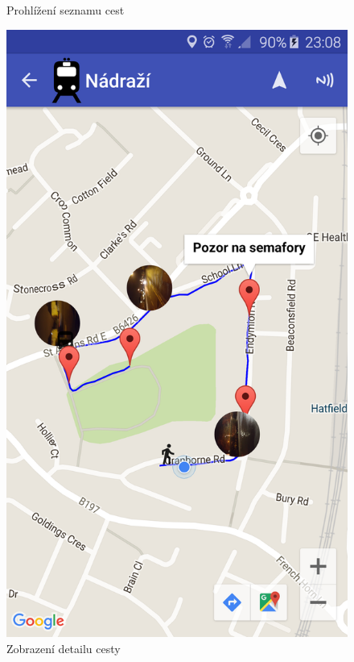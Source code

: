 \documentclass{article}
\begin{document}
\begin{figure}[H]
\begin{minipage}{.5\textwidth}
        \caption{Prohlížení seznamu cest}
        \label{fig:prohlizeniasistent}
\end{minipage}
\begin{minipage}{.5\textwidth}
    \centering
                    \includegraphics[scale=0.14]{img/screen/detailcesty.png}
            \caption{Zobrazení detailu cesty}
            \label{fig:detailasistent}

       \end{minipage}
\end{figure}
\end{document}
